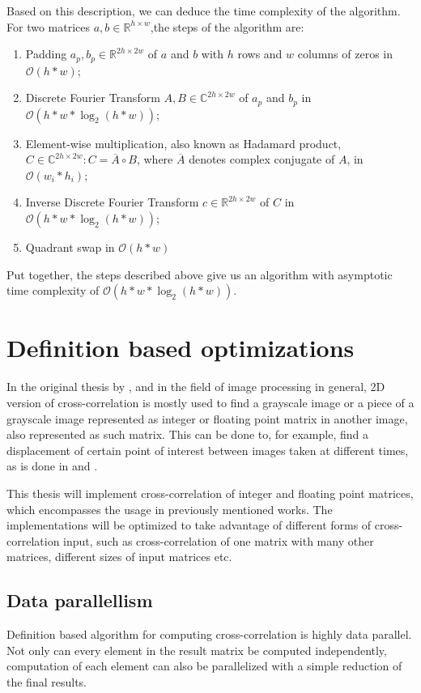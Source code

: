 Based on this description, we can deduce the time complexity of the algorithm. For two matrices $a,b \in \mathbb{R}^{h \times w}$,the steps of the algorithm are:
\begin{enumerate}
	\item Padding $a_p, b_p \in \mathbb{R}^{2h \times 2w}$ of $a$ and $b$ with $h$ rows and $w$ columns of zeros in $\mathcal{O}(h*w)$;
	\item Discrete Fourier Transform $A,B 
	\in \mathbb{C}^{2h \times 2w}$ of $a_p$ and $b_p$ in $\mathcal{O}(h*w*\log_2(h*w))$;
	\item Element-wise multiplication, also known as Hadamard product, $C \in \mathbb{C}^{2h \times 2w}: C = \overline{A} \circ B$, where $\overline{A}$ denotes complex conjugate of $A$, in $\mathcal{O}(w_i*h_i)$;
	\item Inverse Discrete Fourier Transform $c \in \mathbb{R}^{2h \times 2w}$ of $C$ in $\mathcal{O}(h*w*\log_2(h*w))$;
	\item Quadrant swap in $\mathcal{O}(h*w)$
\end{enumerate}

Put together, the steps described above give us an algorithm with asymptotic time complexity of $\mathcal{O}(h*w*\log_2(h*w))$.

\section{Definition based optimizations}
In the original thesis by \citep{misko}, and in the field of image processing in general, 2D version of cross-correlation is mostly used to find a grayscale image or a piece of a grayscale image represented as integer or floating point matrix in another image, also represented as such matrix. This can be done to, for example, find a displacement of certain point of interest between images taken at different times, as is done in \citet{misko} and \citet{zhang2015}. 

This thesis will implement cross-correlation of integer and floating point matrices, which encompasses the usage in previously mentioned works. The implementations will be optimized to take advantage of different forms of cross-correlation input, such as cross-correlation of one matrix with many other matrices, different sizes of input matrices etc. 

\subsection{Data parallellism}
Definition based algorithm for computing cross-correlation is highly data parallel. Not only can every element in the result matrix be computed independently, computation of each element can also be parallelized with a simple reduction of the final results.

